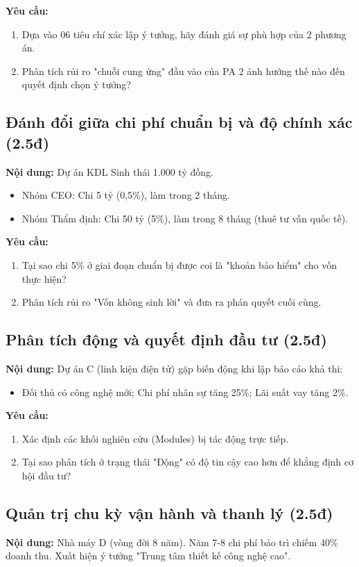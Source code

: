 \textbf{Yêu cầu:}
\begin{enumerate}[label=\alph*)]
    \item Dựa vào 06 tiêu chí xác lập ý tưởng, hãy đánh giá sự phù hợp của 2 phương án.
    \item Phân tích rủi ro "chuỗi cung ứng" đầu vào của PA 2 ảnh hưởng thế nào đến quyết định chọn ý tưởng?
\end{enumerate}

\subsection{Đánh đổi giữa chi phí chuẩn bị và độ chính xác (2.5đ)}
\textbf{Nội dung:} Dự án KDL Sinh thái 1.000 tỷ đồng.
\begin{itemize}
    \item Nhóm CEO: Chi 5 tỷ (0,5\%), làm trong 2 tháng.
    \item Nhóm Thẩm định: Chi 50 tỷ (5\%), làm trong 8 tháng (thuê tư vấn quốc tế).
\end{itemize}

\textbf{Yêu cầu:}
\begin{enumerate}[label=\alph*)]
    \item Tại sao chi 5\% ở giai đoạn chuẩn bị được coi là "khoản bảo hiểm" cho vốn thực hiện?
    \item Phân tích rủi ro "Vốn không sinh lời" và đưa ra phán quyết cuối cùng.
\end{enumerate}

\subsection{Phân tích động và quyết định đầu tư (2.5đ)}
\textbf{Nội dung:} Dự án C (linh kiện điện tử) gặp biến động khi lập báo cáo khả thi:
\begin{itemize}
    \item Đối thủ có công nghệ mới; Chi phí nhân sự tăng 25\%; Lãi suất vay tăng 2\%.
\end{itemize}

\textbf{Yêu cầu:}
\begin{enumerate}[label=\alph*)]
    \item Xác định các khối nghiên cứu (Modules) bị tác động trực tiếp.
    \item Tại sao phân tích ở trạng thái "Động" có độ tin cậy cao hơn để khẳng định cơ hội đầu tư?
\end{enumerate}

\subsection{Quản trị chu kỳ vận hành và thanh lý (2.5đ)}
\textbf{Nội dung:} Nhà máy D (vòng đời 8 năm). Năm 7-8 chi phí bảo trì chiếm 40\% doanh thu. Xuất hiện ý tưởng "Trung tâm thiết kế công nghệ cao".


